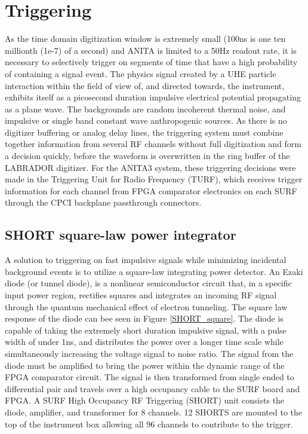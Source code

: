 		
\section{Triggering}
	As the time domain digitization window is extremely small (100ns is one ten millionth (1e-7) of a second) and ANITA is limited to a 50Hz readout rate, it is necessary to selectively trigger on segments of time that have a high probability of containing a signal event.  The physics signal created by a UHE particle interaction within the field of view of, and directed towards, the instrument, exhibits itself as a picosecond duration impulsive electrical potential propagating as a plane wave.  The backgrounds are random incoherent thermal noise, and impulsive or single band constant wave anthropogenic sources.  As there is no digitizer buffering or analog delay lines, the triggering system must combine together information from several RF channels without full digitization and form a decision quickly, before the waveform is overwritten in the ring buffer of the LABRADOR digitizer.  For the ANITA3 system, these triggering decisions were made in the Triggering Unit for Radio Frequency (TURF), which receives trigger information for each channel from FPGA comparator electronics on each SURF through the CPCI backplane passthrough connectors.
	
	\subsection{SHORT square-law power integrator}
		A solution to triggering on fast impulsive signals while minimizing incidental background events is to utilize a square-law integrating power detector.  An Ezaki diode (or tunnel diode)\cite{Esaki}, is a nonlinear semiconductor circuit that, in a specific input power region, rectifies squares and integrates an incoming RF signal through the quantum mechanical effect of electron tunneling.  The square law response of the diode can bee seen in Figure \ref{SHORT_square}.  The diode is capable of taking the extremely short duration impulsive signal, with a pulse width of under 1ns, and distributes the power over a longer time scale while simultaneously increasing the voltage signal to noise ratio.  The signal from the diode must be amplified to bring the power within the dynamic range of the FPGA comparator circuit.  The signal is then transformed from single ended to differential pair and travels over a high occupancy cable to the SURF board and FPGA.  A SURF High Occupancy RF Triggering (SHORT) unit consists the diode, amplifier, and transformer for 8 channels.  12 SHORTS are mounted to the top of the instrument box allowing all 96 channels to contribute to the trigger.
		

